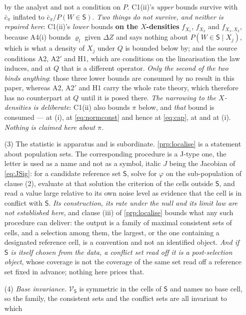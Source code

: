\begin{remark}
\begin{enumerate}
by the analyst and not a condition on $P$. C1(ii)'s \emph{upper} bounds survive with $\bar c_\pi$
inflated to $\bar c_\pi/P(W\in\mathsf S)$. \emph{Two things do not survive, and neither is repaired
here}: C1(ii)'s \emph{lower} bounds \textbf{on the $X$-densities} $f_{X_1}$, $f_{X_2}$ and
$f_{X_1,X_2}$, because A4(i) bounds $\varrho_l$ given $\Delta Z$ and says nothing
about $P(W\in\mathsf S\mid X_j)$, which is what a density of $X_j$ under $Q$ is bounded below by; and the
source conditions A2, A2$'$ and H1, which are conditions on the linearisation the law induces, and at $Q$
that is a different operator. \emph{Only the second of the two binds anything}: those three lower bounds
are consumed by no result in this paper, whereas A2, A2$'$ and H1 carry the whole rate theory, which
therefore has no counterpart at $Q$ until it is posed there. \emph{The narrowing to the $X$-densities is
deliberate}: C1(ii) also bounds $\pi$ below, and \emph{that} bound is consumed --- at
\textup{(i)}, at \eqref{eq:normconst} and hence at \eqref{eq:cap}, at
 and at \textup{(i)}. \emph{Nothing is claimed here about
$\pi$.}
\item[(3)] The statistic is apparatus and is subordinate. \cref{prp:localise} is a statement about
population sets. The corresponding procedure is a J-type one, the letter is used as a name and not as
a symbol, italic $J$ being the Jacobian of \eqref{eq:JSig}: for a candidate reference set
$\mathsf S$, solve for $\varphi$ on the sub-population of clause \textup{(2)}, evaluate at that solution
the criterion of the cells outside $\mathsf S$, and read a value large relative to its own noise level as
evidence that the cell is in conflict with $\mathsf S$. \emph{Its construction, its rate under the null
and its limit law are not established here}, and clause \textup{(iii)} of \cref{prp:localise} bounds what
any such procedure can deliver: the output is a family of maximal consistent sets of cells, and a
selection among them, the largest, or the one containing a designated reference cell, is a
convention and not an identified object. \emph{And if $\mathsf S$ is itself chosen from the data, a
conflict set read off it is a post-selection object}, whose coverage is not the coverage of the same set
read off a reference set fixed in advance; nothing here prices that.
\item[(4)] \emph{Base invariance.} $\mathcal V_{\mathsf S}$ is symmetric in the cells of $\mathsf S$ and
names no base cell, so the family, the consistent sets and the conflict sets are all invariant to which

\end{enumerate}
\end{remark}
